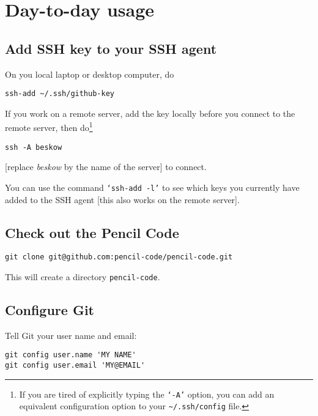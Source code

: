 \documentclass[12pt,pdftex]{article}
\begin{document}
\section{Day-to-day usage}
\label{sec-2}

\subsection{Add SSH key to your SSH agent}
\label{sec-2-1}

On you local laptop or desktop computer, do
\lstset{frame=single,basicstyle=\ttfamily\footnotesize,language=sh,label= ,caption= ,captionpos=b,numbers=none}
\begin{lstlisting}
ssh-add ~/.ssh/github-key
\end{lstlisting}

If you work on a remote server, add the key locally before you connect
to the remote server, then do\footnote{If you are tired of explicitly typing the \texttt{‘-A’} option, you can add
an equivalent configuration option to your \texttt{\textasciitilde{}/.ssh/config} file.}
\lstset{frame=single,basicstyle=\ttfamily\footnotesize,language=sh,label= ,caption= ,captionpos=b,numbers=none}
\begin{lstlisting}
ssh -A beskow
\end{lstlisting}
[replace \emph{beskow} by the name of the server] to connect.

You can use the command \texttt{‘ssh-add -l’} to see which keys you currently
have added to the SSH agent [this also works on the remote server].


\subsection{Check out the Pencil Code}
\label{sec-2-2}

\lstset{frame=single,basicstyle=\ttfamily\footnotesize,language=sh,label= ,caption= ,captionpos=b,numbers=none}
\begin{lstlisting}
git clone git@github.com:pencil-code/pencil-code.git
\end{lstlisting}
This will create a directory \texttt{pencil-code}.


\subsection{Configure Git}
\label{sec-2-3}

Tell Git your user name and email:
\lstset{frame=single,basicstyle=\ttfamily\footnotesize,language=sh,label= ,caption= ,captionpos=b,numbers=none}
\begin{lstlisting}
git config user.name 'MY NAME'
git config user.email 'MY@EMAIL'
\end{lstlisting}
\end{document}

